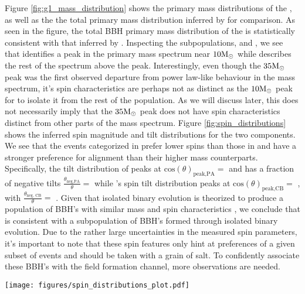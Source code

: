 
Figure \ref{fig:g1_mass_distribution} shows the primary mass distributions of the \base{}, as well as the the total primary mass distribution inferred by \brucepaper{} for comparison. As seen in the figure, the total BBH primary mass distribution of the \base{} is statistically consistent with that inferred by \brucepaper{}. Inspecting the subpopulations, \first{} and \contB{}, we see that \first{} identifies a peak in the primary mass spectrum near $10{\rm M}_\odot$ while \contB{} describes the rest of the spectrum above the peak. Interestingly, even though the $35{\rm M}_\odot$ peak was the first observed departure from power law-like behaviour in the mass spectrum, it's spin characteristics are perhaps not as distinct as the $10{\rm M}_\odot$ peak for \first{} to isolate it from the rest of the population. As we will discuss later, this does not necessarily imply that the $35{\rm M}_\odot$ peak does not have spin characteristics distinct from other parts of the mass spectrum. Figure \ref{fig:spin_distributions} shows the inferred spin magnitude and tilt distributions for the two components. We see that the events categorized in \first{} prefer lower spins than those in \contB{} and have a stronger preference for alignment than their higher mass counterparts. Specifically, the tilt distribution of \first{} peaks at $\text{cos}(\theta)_\text{peak,PA}=$ \result{$\CIPlusMinus{\macros[CosTilt][Base][PeakA][max]}$} and has a fraction of negative tilts $\frac{\theta_\text{neg,PA}}{\theta}=$ \result{$\CIPlusMinus{\macros[CosTilt][Base][PeakA][negfrac]}$} while \contB{}'s spin tilt distribution peaks at $\text{cos}(\theta)_\text{peak,CB}=$ \result{$\CIPlusMinus{\macros[CosTilt][Base][ContinuumB][max]}$}, with $\frac{\theta_\text{neg, CB}}{\theta} = $ \result{$\CIPlusMinus{\macros[CosTilt][Base][ContinuumB][negfrac]}$}. Given that isolated binary evolution is theorized to produce a population of BBH's with similar mass and spin characteristics , we conclude that \first{} is consistent with a subpopulation of BBH's formed through isolated binary evolution. Due to the rather large uncertainties in the measured spin parameters, it's important to note that these spin features only hint at preferences of a given subset of events and should be taken with a grain of salt. To confidently associate these BBH's with the field formation channel, more observations are needed. 

\begin{figure*}[ht!]
    \begin{centering}
        \texttt{[image: figures/spin\_distributions\_plot.pdf]}
        \caption{The marginal primary spin magnitude distribution}
        \label{fig:spin_distributions}
    \end{centering}
\end{figure*}

